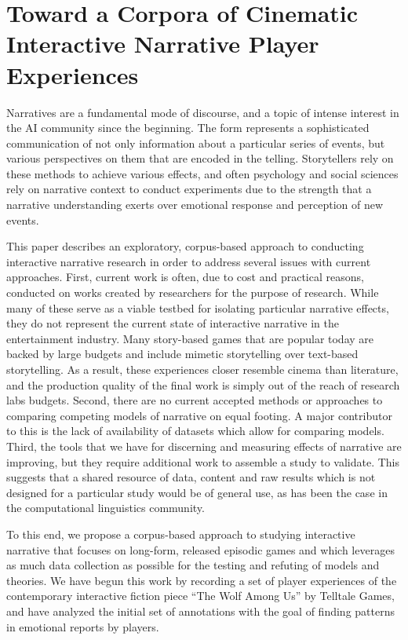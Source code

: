 \section{Toward a Corpora of Cinematic Interactive Narrative Player Experiences}
\label{sec:orgheadline1}
Narratives are a fundamental mode of discourse, and a topic of intense
interest in the AI community since the beginning. The form represents
a sophisticated communication of not only information about a
particular series of events, but various perspectives on them that are
encoded in the telling. Storytellers rely on these methods to achieve
various effects, and often psychology and social sciences rely on
narrative context to conduct experiments due to the strength that a
narrative understanding exerts over emotional response and perception
of new events.

This paper describes an exploratory, corpus-based approach to conducting interactive narrative research in order to address several issues with current approaches. First, current work is often, due to cost and practical reasons, conducted on works created by researchers for the purpose of research. While many of these serve as a viable testbed for isolating particular narrative effects, they do not represent the current state of interactive narrative in the entertainment industry. Many story-based games that are popular today are backed by large budgets and include mimetic storytelling over text-based storytelling. As a result, these experiences closer resemble cinema than literature, and the production quality of the final work is simply out of the reach of research labs budgets. Second, there are no current accepted methods or approaches to comparing competing models of narrative on equal footing. A major contributor to this is the lack of availability of datasets which allow for comparing models. Third, the tools that we have for discerning and measuring effects of narrative are improving, but they require additional work to assemble a study to validate. This suggests that a shared resource of data, content and raw results which is not designed for a particular study would be of general use, as has been the case in the computational linguistics community. 

To this end, we propose a corpus-based approach to studying interactive narrative that focuses on long-form, released episodic games and which leverages as much data collection as possible for the testing and refuting of models and theories. We have begun this work by recording a set of player experiences of the contemporary interactive fiction piece “The Wolf Among Us” by Telltale Games, and have analyzed the initial set of annotations with the goal of finding patterns in emotional reports by players.


